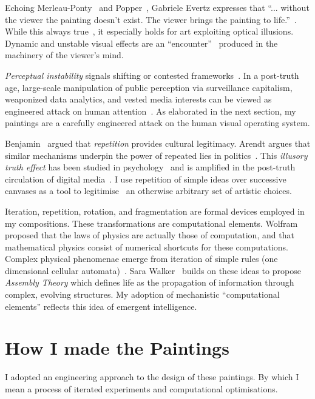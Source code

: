 \documentclass[12pt]{article}
\begin{document}
Echoing Merleau-Ponty~\cite{merleauPonty1962phenomenology} and
Popper~\cite{popper1972objective}, Gabriele Evertz expresses that
``... without the viewer the painting doesn't exist. The viewer brings
the painting to life.''~\cite{evertz09documentary}. While this always
true~\cite{barthes1977death}, it especially holds for art exploiting
optical illusions. Dynamic and unstable visual effects are an
``encounter''~\cite{encounter} produced in the machinery of the
viewer's mind.

\emph{Perceptual instability} signals shifting or contested
frameworks~\cite{kuhn1970structure}. In a
post-truth~\cite{keyes2004posttruth,mcintyre2018posttruth} age,
large-scale manipulation of public perception via surveillance
capitalism, weaponized data analytics, and vested media interests can
be viewed as engineered attack on human
attention~\cite{zuboff2019surveillance, steyerl2016sea}. As elaborated
in the next section, my paintings are a carefully engineered attack on
the human visual operating system.

Benjamin~\cite{benjamin1935kunstwerk} argued that \emph{repetition}
provides cultural legitimacy. Arendt argues that similar mechanisms
underpin the power of repeated lies in
politics~\cite{arendt1972lying}. This \emph{illusory truth effect} has
been studied in psychology~\cite{hasher1977frequency} and is amplified
in the post-truth~\cite{keyes2004posttruth,mcintyre2018posttruth}
circulation of digital media~\cite{zuboff2019surveillance}. I use
repetition of simple ideas over successive canvases as a tool to
legitimise~\cite{foster1996return,neely-repetition} an otherwise
arbitrary set of artistic choices.

Iteration, repetition, rotation, and fragmentation are formal devices
employed in my compositions. These transformations are computational
elements. Wolfram~\cite{wolfram1984} proposed that the laws of physics
are actually those of computation, and that mathematical physics
consist of numerical shortcuts for these computations. Complex
physical phenomenae emerge from iteration of simple rules
(one dimensional cellular automata)~\cite{wolfram}. Sara
Walker~\cite{walker2024life} builds on these ideas to propose
\emph{Assembly Theory} which defines life as the propagation of
information through complex, evolving structures. My adoption of
mechanistic ``computational elements'' reflects this idea of
emergent intelligence.

\section{How I made the Paintings}\label{sec:process}
I adopted an engineering approach to the design of these paintings. By
which I mean a process of iterated experiments and computational
optimisations.
\end{document}
